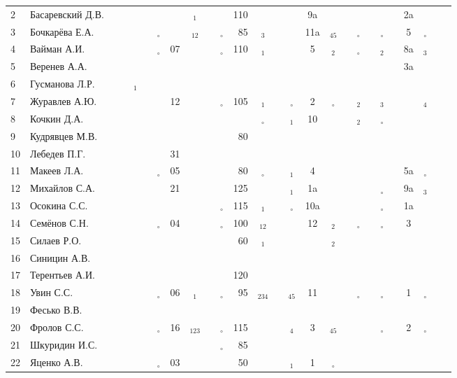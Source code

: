 \documentclass[a4paper,landscape,11pt]{article}
\newcommand*\OK{&\small \ding{51}$\!\!_\circ$} %
\newcommand*\Ok{&\small \ding{51}$\!\!_\circ$} %
\newcommand*\ok{&{\small \ding{51}}} %
\newcommand*\no{&{\small }} %
\newcommand*\da{&{\small\ding{48}$\!\!_1$}} %
\newcommand*\dab{&{\small\ding{48}$\!\!_{12}$}} %
\newcommand*\ab{&{\small\ding{48}$\!\!_{12}$}} %
\newcommand*\dabc{&{\small\ding{48}$\!\!_{123}$}} %
\newcommand*\db{&{\small\ding{48}$\!\!_2$}} %
\newcommand*\dc{&{\small\ding{48}$\!\!_3$}} %
\newcommand*\dd{&{\small\ding{48}$\!\!_4$}} %
\newcommand*\bd{&{\small\ding{48}$\!\!_{234}$}} %
\newcommand*\de{&{\small\ding{48}$\!\!_{45}$}} %
\begin{document}
\begin{tabular}{l|l|cccccccccrcccccccccccccc}
 2&Басаревский Д.В.\ok\ok\ok\ok\no\no\da  \ok\ok&110\ok\no\ok& 9a\no\no\no\no\no\no& 2a\ok\ok\\
 3&Бочкарёва Е.А.  \ok\ok\ok\ok\OK\ok\dab \ok\OK& 85\dc\no\ok&11a\de\ok\Ok\ok\Ok\no&  5\Ok\no\\
 4&Вайман А.И.     \no\no\no\ok\OK&07\ok  \ok\OK&110\da\ok\ok&  5\db\ok\Ok\ok\db\ok& 8a\dc\ok\\
 5&Веренев А.А.    \no\no\no\no\ok\no\no  \ok\ok \no\no\no\no \no\ok\no\no\no\no\no& 3a\ok\ok\\
 6&Гусманова Л.Р.  \ok\ok\da\ok\no\no\no  \no\no \no\no\no\no \no\no\no\no\no\no\no \no\no\no\\
 7&Журавлев А.Ю.   \no\no\no\no\ok&12\ok  \ok\OK&105\da\ok\Ok&  2\Ok\ok\db\ok\dc\no \no\dd\ok\\
 8&Кочкин Д.А.     \no\no\no\no\ok\ok\no  \ok\no \no\Ok\no\da& 10\no\no\db\ok\Ok\no \no\no\no\\
 9&Кудрявцев М.В.  \no\no\ok\ok\no\no\no  \ok\ok& 80\ok\ok\no \no\no\no\no\no\no\no  \no\no\no\\
10&Лебедев П.Г.    \ok\ok\no\ok\ok&31\no  \ok\no \no\no\no\no \no\no\ok\ok\ok\no\no \no\no\no\\
11&Макеев Л.А.     \ok\ok\ok\ok\OK&05\ok  \ok\ok& 80\Ok\ok\da&  4\ok\ok\ok\ok\no\ok& 5a\Ok\ok\\
\midrule
12&Михайлов С.А.   \no\no\ok\ok\ok&21\no  \ok\ok&125\ok\ok\da& 1a\ok\ok\ok\ok\Ok\ok& 9a\dc\ok\\
13&Осокина С.С.    \ok\ok\ok\ok\no\no\ok  \ok\OK&115\da\no\Ok&10a\ok\no\ok\no\Ok\no& 1a\no\ok\\
14&Семёнов С.Н.    \ok\ok\ok\ok\OK&04\ok  \ok\OK&100\ab\ok\ok& 12\db\no\Ok\ok\Ok\ok&  3\no\ok\\
15&Силаев Р.О.     \ok\ok\no\no\no\no\no  \no\ok& 60\da\ok\no \no\db\no\ok\no\no\no \no\no\no\\
16&Синицин А.В.    \ok\ok\no\ok\no\no\no  \no\no \no\no\no\no \no\no\no\no\no\no\no \no\no\no\\
17&Терентьев А.И.  \ok\ok\ok\ok\no\no\no  \no\ok&120\no\no\no \no\no\no\no\no\no\no \no\no\no\\
18&Увин С.С.       \ok\ok\ok\ok\OK&06\da  \ok\OK& 95\bd\ok\de& 11\ok\ok\Ok\ok\Ok\ok&  1\Ok\ok\\
19&Фесько В.В.     \no\no\no\no\no\no\no  \no\no \no\no\no\no \no\no\no\no\no\no\no \no\no\no\\
20&Фролов С.С.     \ok\ok\ok\ok\OK&16\dabc\ok\OK&115\ok\ok\dd&  3\de\ok\ok\ok\Ok\no&  2\Ok\ok\\ 
21&Шкуридин И.С.   \ok\ok\ok\ok\ok\no\ok  \ok\OK& 85\ok\ok\no \no\ok\no\no\no\no\ok \no\no\no\\
22&Яценко А.В.     \ok\ok\ok\ok\OK&03\ok  \ok\ok& 50\ok\ok\da&  1\Ok\no\no\no\no\ok \no\no\no\\ 
\bottomrule
\end{tabular} 
\newpage
\end{document}
